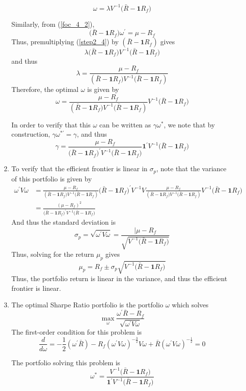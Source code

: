 \documentclass[11pt]{article}
\newcommand{\w}{\omega}
\newcommand{\p}{\prime}
\newcommand{\one}{\mathbf{1}}
\newcommand{\onep}{\mathbf{1}^\prime}
\newcommand{\inv}[1]{#1^{-1}}
\renewcommand{\wp}{\omega^\prime}
\begin{document}
\begin{enumerate}
\begin{enumerate}
		\begin{equation}\label{step2_4}
		\w = \lambda \inv{V} \big(\bar{R} - \one R_f\big)
		\end{equation}
		
		Similarly, from (\ref{foc_4_2}), 
		\[\big(\bar{R} - \one R_f\big)\wp = \mu - R_f\]
		Thus, premultiplying (\ref{step2_4}) by $ (\bar{R} - \one R_f) $ gives
		\[\lambda\big(\bar{R} - \one R_f\big) \inv{V} \big(\bar{R} - \one R_f\big)\]
		and thus
		\[\lambda = \frac{\mu - R_f}{(\bar{R} - \one R_f\big) \inv{V} \big(\bar{R} - \one R_f )}\]
		Therefore, the optimal $ \w $ is given by 
		\[\w = \frac{\mu - R_f}{(\bar{R} - \one R_f\big) \inv{V} \big(\bar{R} - \one R_f )} \inv{V} \big(\bar{R} - \one R_f\big) \]
		
		In order to verify that this $\omega$ can be written as $ \gamma \w^* $, we note that by construction, $ \gamma \w^{*\p} = \gamma $, and thus 
		\[\gamma = \frac{\mu - R_f}{\big(\bar{R} - \one R_f\big)^\p \inv{V}\big(\bar{R} - \one R_f\big)} \one^\p \inv{V}\big(\bar{R} - \one R_f\big)\]
		
		\item To verify that the efficient frontier is linear in $ \sigma_p $, note that the variance of this portfolio is given by 
		\begin{align*}
		\wp V\w &= \frac{\mu - R_f}{(\bar{R} - \one R_f\big) \inv{V} \big(\bar{R} - \one R_f )} \big(\bar{R} - \one R_f\big)^\p \inv{V} V \frac{\mu - R_f}{(\bar{R} - \one R_f\big) \inv{V} \big(\bar{R} - \one R_f )} \inv{V} \big(\bar{R} - \one R_f\big) \\
		&= \frac{(\mu - R_f)^2}{\big(\bar{R} - \one R_f\big)^\p \inv{V} \big(\bar{R} - \one R_f\big)}
		\end{align*}
		And thus the standard deviation is 
		\[\sigma_p = \sqrt{\wp V \w} = \frac{|\mu - R_f}{\sqrt{\inv{V} \big(\bar{R} - \one R_f\big)}}\]
		Thus, solving for the return $ \mu_p $ gives
		\[\mu_p = R_f \pm \sigma_p \sqrt{\inv{V} \big(\bar{R} - \one R_f\big)}\]
		Thus, the portfolio return is linear in the variance, and thus the efficient frontier is linear. 
		
		\item The optimal Sharpe Ratio portfolio is the portfolio $ \w $ which solves
		\[\max_\w \frac{\wp\bar{R} - R_f}{\sqrt{\wp V \w}}\]
		The first-order condition for this problem is 
		\[\frac{d}{d\w} = -\frac{1}{2}(\wp \bar{R}) - R_f (\wp V \w)^{-\frac{3}{2}} V\w + \bar{R}(\wp V \w)^{-\frac{1}{2}} = 0 \]
		
		The portfolio solving this problem is 
		\[\w^* = \frac{\inv{V}\big(\bar{R} - \one R_f\big)}{\onep \inv{V} \big(\bar{R} - \one R_f\big)} \]
		

\end{enumerate}
\end{enumerate}
\end{document}
